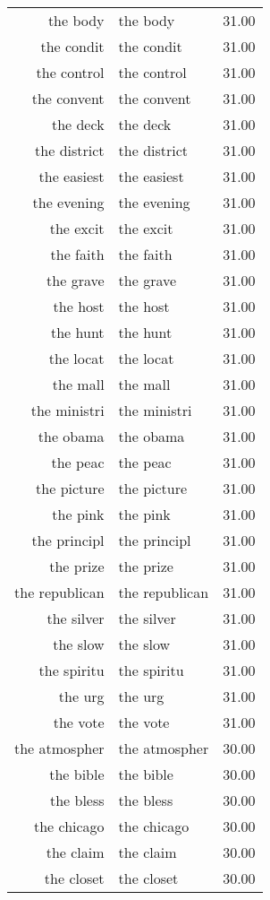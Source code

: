 \begin{table}[ht]
\begin{tabular}{rlr}
  the body & the body & 31.00 \\ 
  the condit & the condit & 31.00 \\ 
  the control & the control & 31.00 \\ 
  the convent & the convent & 31.00 \\ 
  the deck & the deck & 31.00 \\ 
  the district & the district & 31.00 \\ 
  the easiest & the easiest & 31.00 \\ 
  the evening & the evening & 31.00 \\ 
  the excit & the excit & 31.00 \\ 
  the faith & the faith & 31.00 \\ 
  the grave & the grave & 31.00 \\ 
  the host & the host & 31.00 \\ 
  the hunt & the hunt & 31.00 \\ 
  the locat & the locat & 31.00 \\ 
  the mall & the mall & 31.00 \\ 
  the ministri & the ministri & 31.00 \\ 
  the obama & the obama & 31.00 \\ 
  the peac & the peac & 31.00 \\ 
  the picture & the picture & 31.00 \\ 
  the pink & the pink & 31.00 \\ 
  the principl & the principl & 31.00 \\ 
  the prize & the prize & 31.00 \\ 
  the republican & the republican & 31.00 \\ 
  the silver & the silver & 31.00 \\ 
  the slow & the slow & 31.00 \\ 
  the spiritu & the spiritu & 31.00 \\ 
  the urg & the urg & 31.00 \\ 
  the vote & the vote & 31.00 \\ 
  the atmospher & the atmospher & 30.00 \\ 
  the bible & the bible & 30.00 \\ 
  the bless & the bless & 30.00 \\ 
  the chicago & the chicago & 30.00 \\ 
  the claim & the claim & 30.00 \\ 
  the closet & the closet & 30.00 \\ 

\end{tabular}
\end{table}
